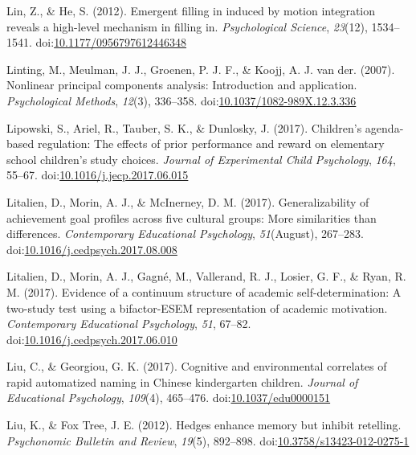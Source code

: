 \documentclass[english,man]{apa6}
\begin{document}
\hypertarget{ref-Lin2012a}{}
Lin, Z., \& He, S. (2012). Emergent filling in induced by motion
integration reveals a high-level mechanism in filling in.
\emph{Psychological Science}, \emph{23}(12), 1534--1541.
doi:\href{https://doi.org/10.1177/0956797612446348}{10.1177/0956797612446348}

\hypertarget{ref-Linting2007}{}
Linting, M., Meulman, J. J., Groenen, P. J. F., \& Koojj, A. J. van der.
(2007). Nonlinear principal components analysis: Introduction and
application. \emph{Psychological Methods}, \emph{12}(3), 336--358.
doi:\href{https://doi.org/10.1037/1082-989X.12.3.336}{10.1037/1082-989X.12.3.336}

\hypertarget{ref-Lipowski2017}{}
Lipowski, S., Ariel, R., Tauber, S. K., \& Dunlosky, J. (2017).
Children's agenda-based regulation: The effects of prior performance and
reward on elementary school children's study choices. \emph{Journal of
Experimental Child Psychology}, \emph{164}, 55--67.
doi:\href{https://doi.org/10.1016/j.jecp.2017.06.015}{10.1016/j.jecp.2017.06.015}

\hypertarget{ref-Litalien2017a}{}
Litalien, D., Morin, A. J., \& McInerney, D. M. (2017). Generalizability
of achievement goal profiles across five cultural groups: More
similarities than differences. \emph{Contemporary Educational
Psychology}, \emph{51}(August), 267--283.
doi:\href{https://doi.org/10.1016/j.cedpsych.2017.08.008}{10.1016/j.cedpsych.2017.08.008}

\hypertarget{ref-Litalien2017}{}
Litalien, D., Morin, A. J., Gagné, M., Vallerand, R. J., Losier, G. F.,
\& Ryan, R. M. (2017). Evidence of a continuum structure of academic
self-determination: A two-study test using a bifactor-ESEM
representation of academic motivation. \emph{Contemporary Educational
Psychology}, \emph{51}, 67--82.
doi:\href{https://doi.org/10.1016/j.cedpsych.2017.06.010}{10.1016/j.cedpsych.2017.06.010}

\hypertarget{ref-Liu2017a}{}
Liu, C., \& Georgiou, G. K. (2017). Cognitive and environmental
correlates of rapid automatized naming in Chinese kindergarten children.
\emph{Journal of Educational Psychology}, \emph{109}(4), 465--476.
doi:\href{https://doi.org/10.1037/edu0000151}{10.1037/edu0000151}

\hypertarget{ref-Liu2012a}{}
Liu, K., \& Fox Tree, J. E. (2012). Hedges enhance memory but inhibit
retelling. \emph{Psychonomic Bulletin and Review}, \emph{19}(5),
892--898.
doi:\href{https://doi.org/10.3758/s13423-012-0275-1}{10.3758/s13423-012-0275-1}
\end{document}
